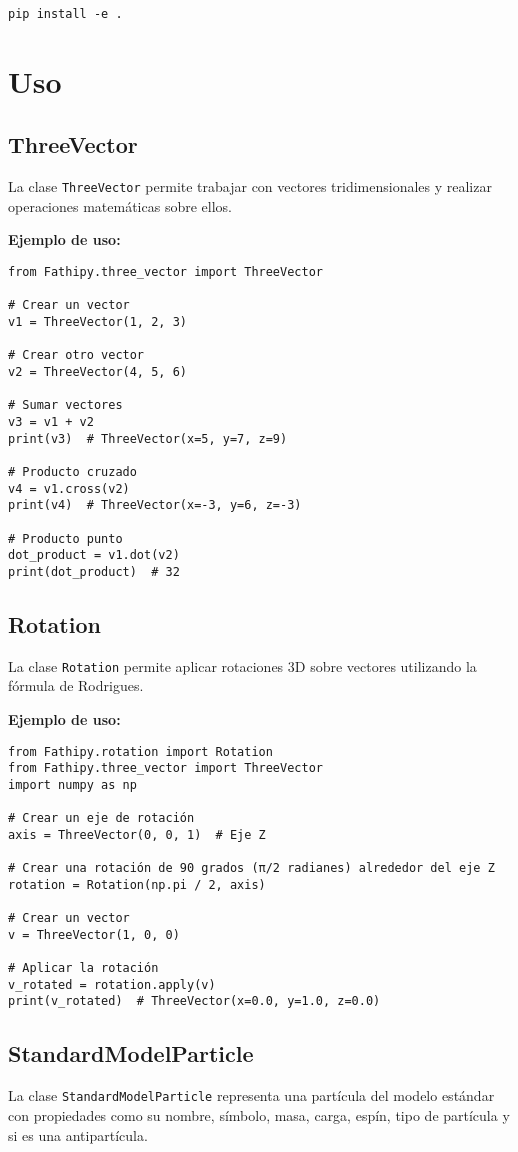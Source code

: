 \documentclass{article}
\begin{document}
\begin{verbatim}
pip install -e .
\end{verbatim}

\section{Uso}

\subsection{ThreeVector}
La clase \texttt{ThreeVector} permite trabajar con vectores tridimensionales y realizar operaciones matemáticas sobre ellos.

\textbf{Ejemplo de uso:}
\begin{verbatim}
from Fathipy.three_vector import ThreeVector

# Crear un vector
v1 = ThreeVector(1, 2, 3)

# Crear otro vector
v2 = ThreeVector(4, 5, 6)

# Sumar vectores
v3 = v1 + v2
print(v3)  # ThreeVector(x=5, y=7, z=9)

# Producto cruzado
v4 = v1.cross(v2)
print(v4)  # ThreeVector(x=-3, y=6, z=-3)

# Producto punto
dot_product = v1.dot(v2)
print(dot_product)  # 32
\end{verbatim}

\subsection{Rotation}
La clase \texttt{Rotation} permite aplicar rotaciones 3D sobre vectores utilizando la fórmula de Rodrigues.

\textbf{Ejemplo de uso:}
\begin{verbatim}
from Fathipy.rotation import Rotation
from Fathipy.three_vector import ThreeVector
import numpy as np

# Crear un eje de rotación
axis = ThreeVector(0, 0, 1)  # Eje Z

# Crear una rotación de 90 grados (π/2 radianes) alrededor del eje Z
rotation = Rotation(np.pi / 2, axis)

# Crear un vector
v = ThreeVector(1, 0, 0)

# Aplicar la rotación
v_rotated = rotation.apply(v)
print(v_rotated)  # ThreeVector(x=0.0, y=1.0, z=0.0)
\end{verbatim}

\subsection{StandardModelParticle}
La clase \texttt{StandardModelParticle} representa una partícula del modelo estándar con propiedades como su nombre, símbolo, masa, carga, espín, tipo de partícula y si es una antipartícula.
\end{document}
